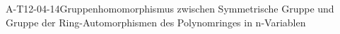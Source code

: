 
\begin{LEM}{A-T12-04-14}{Gruppenhomomorphismus zwischen Symmetrische Gruppe und Gruppe der Ring-Automorphismen des Polynomringes in n-Variablen}
\end{LEM}
